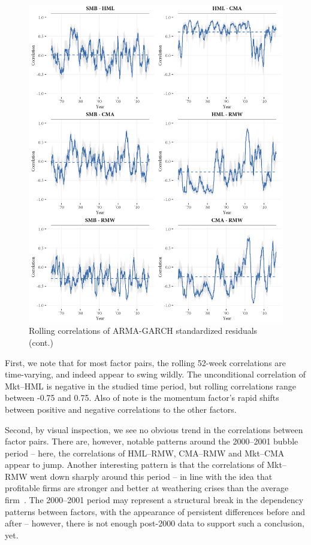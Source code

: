 \begin{figure}[!p]
  \ContinuedFloat
  \centering
  \includegraphics[scale=1]{graphics/rolling2.png}  
  \footnotesize
  \caption{Rolling correlations of ARMA-GARCH standardized residuals (cont.)}
\end{figure}
First, we note that for most factor pairs, the rolling 52-week correlations are time-varying, and indeed appear to swing wildly. The unconditional correlation of Mkt--HML is negative in the studied time period, but rolling correlations range between -0.75 and 0.75. Also of note is the momentum factor's rapid shifts between positive and negative correlations to the other factors. 

Second, by visual inspection, we see no obvious trend in the correlations between factor pairs. There are, however, notable patterns around the 2000--2001 bubble period -- here, the correlations of HML--RMW, CMA--RMW and Mkt--CMA appear to jump. Another interesting pattern is that the correlations of Mkt--RMW went down sharply around this period -- in line with the idea that profitable firms are stronger and better at weathering crises than the average firm~\autocite{NovyMarx2013}. The 2000--2001 period may represent a structural break in the dependency patterns between factors, with the appearance of persistent differences before and after -- however, there is not enough post-2000 data to support such a conclusion, yet.

